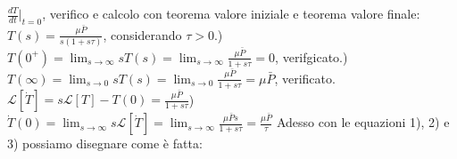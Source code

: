 \newline
$\frac{dT}{dt}|_{t=0}$, verifico e calcolo con teorema valore iniziale e teorema valore finale: $T(s) = \frac{\mu \bar{P}}{s(1+s \tau)}$, considerando $\tau> 0$.) $T(0^+) = \lim_{s\rightarrow \infty} s T(s) = \lim_{s\rightarrow \infty} \frac{\mu \bar{P}}{1+s \tau} = 0$, verifgicato.) $T(\infty) = \lim_{s\rightarrow 0}s T(s) = \lim_{s\rightarrow 0}\frac{\mu \bar{P}}{1 + s\tau} = \mu \bar{P}$, verificato.\newline
$\mathcal{L}[\dot{T}] = s \mathcal{L}[T] - T(0) = \frac{\mu \bar{P}}{1 + s \tau}$) $\dot{T}(0) = \lim_{s\rightarrow \infty} s \mathcal{L}[\dot{T}] = \lim_{s\rightarrow \infty}\frac{\mu \bar{P} s}{1+ s \tau} = \frac{\mu \bar{P}}{\tau}$\newline
\newline
Adesso con le equazioni 1), 2) e 3) possiamo disegnare come è fatta:\newline